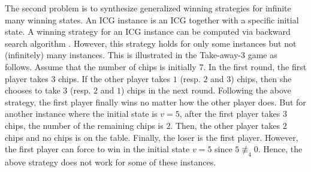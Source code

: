 \documentclass[review]{elsarticle}
\newcommand{\nmodulo}{\not \equiv}
\begin{document}
	The second problem is to synthesize generalized winning strategies for infinite many winning states.
	An ICG instance is an ICG together with a specific initial state.
	A winning strategy for an ICG instance can be computed via backward search algorithm \cite{JonZ2016}.
	However, this strategy holds for only some instances but not (infinitely) many instances.  
	This is illustrated in the Take-away-$3$ game as follows.
	Assume that the number of chips is initially $7$.
	In the first round, the first player takes $3$ chips.
	If the other player takes $1$ (resp. $2$ and $3$) chips, then she chooses to take $3$ (resp. $2$ and $1$) chips in the next round.
	Following the above strategy, the first player finally wins no matter how the other player does.
	But for another instance where the initial state is $v = 5$, after the first player takes $3$ chips, the number of the remaining chips is $2$.
	Then, the other player takes $2$ chips and no chips is on the table.
	Finally, the loser is the first player.	
	However, the first player can force to win in the initial state $v = 5$ since $5 \nmodulo_4 0$.
	Hence, the above strategy does not work for some of these instances.
	
%		
    

\end{document}

